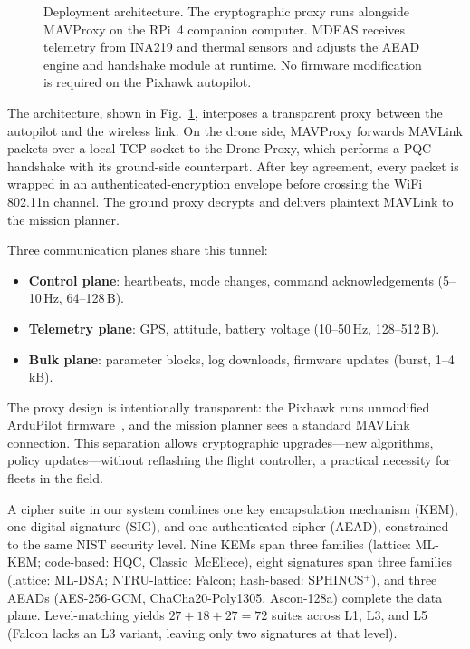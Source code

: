 \documentclass[conference]{IEEEtran}
\newcommand{\mdeas}{\textsc{MDEAS}}
\begin{document}
\begin{figure}[t]
{
  }
  \caption{Deployment architecture.  The cryptographic proxy runs
    alongside MAVProxy on the RPi~4 companion computer.  \mdeas{}
    receives telemetry from INA219 and thermal sensors and adjusts
    the AEAD engine and handshake module at runtime.  No firmware
    modification is required on the Pixhawk autopilot.}
  \label{fig:arch}
\end{figure}

The architecture, shown in Fig.~\ref{fig:arch}, interposes a
transparent proxy between the autopilot and the wireless link.  On
the drone side, MAVProxy forwards MAVLink packets over a local TCP
socket to the Drone Proxy, which performs a PQC handshake with its
ground-side counterpart.  After key agreement, every packet is wrapped
in an authenticated-encryption envelope before crossing the WiFi
802.11n channel.  The ground proxy decrypts and delivers plaintext
MAVLink to the mission planner.

Three communication planes share this tunnel:
\begin{itemize}
  \item \textbf{Control plane}: heartbeats, mode changes, command
    acknowledgements (5--10\,Hz, 64--128\,B).
  \item \textbf{Telemetry plane}: GPS, attitude, battery voltage
    (10--50\,Hz, 128--512\,B).
  \item \textbf{Bulk plane}: parameter blocks, log downloads, firmware
    updates (burst, 1--4\,kB).
\end{itemize}

The proxy design is intentionally transparent: the Pixhawk runs
unmodified ArduPilot firmware~\cite{ardupilot}, and the mission
planner sees a standard MAVLink connection.  This separation allows
cryptographic upgrades---new algorithms, policy updates---without
reflashing the flight controller, a practical necessity for fleets
in the field.

A cipher suite in our system combines one key encapsulation mechanism
(KEM), one digital signature (SIG), and one authenticated cipher
(AEAD), constrained to the same NIST security level.  Nine KEMs span
three families (lattice: ML-KEM; code-based: HQC, Classic~McEliece),
eight signatures span three families (lattice: ML-DSA; NTRU-lattice:
Falcon; hash-based: SPHINCS$^+$), and three AEADs (AES-256-GCM,
ChaCha20-Poly1305, Ascon-128a) complete the data plane.
Level-matching yields $27 + 18 + 27 = 72$ suites across L1, L3, and
L5 (Falcon lacks an L3 variant, leaving only two signatures at that
level).
\end{document}
